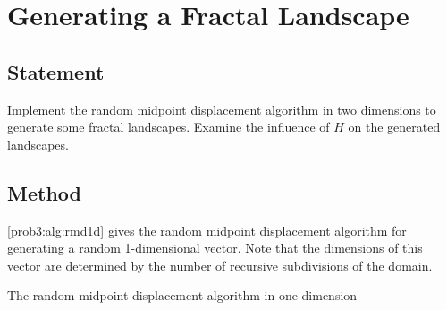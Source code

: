 \section{Generating a Fractal Landscape}

\subsection{Statement}
Implement the random midpoint displacement algorithm in two dimensions to generate some fractal landscapes.
Examine the influence of $H$ on the generated landscapes.

\subsection{Method}
\autoref{prob3:alg:rmd1d} gives the random midpoint displacement algorithm for generating a random 1-dimensional vector.
Note that the dimensions of this vector are determined by the number of recursive subdivisions of the domain.

\begin{algorithm}[H]
    \begin{algorithmic}
            \EndFor{}
            \State{}
            \State{}
        \EndFunction{}
                \State{}
                \State{}
            \EndIf{}
        \EndFunction{}
    \end{algorithmic}
    \caption{The random midpoint displacement algorithm in one dimension}\label{prob3:alg:rmd1d}
\end{algorithm}

